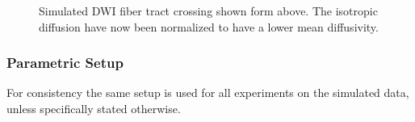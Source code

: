 \documentclass[twocolumn]{svjour3}
\begin{document}
\begin{figure}[!t]
  \centering {}
  \hspace*{.5cm}
  \caption{Simulated DWI fiber tract crossing shown form above. The isotropic diffusion
    have now been normalized to have a lower mean diffusivity.}
  \label{fig:crossingandnoise3}
\end{figure}
\subsubsection{Parametric Setup}
For consistency the same setup is used for all experiments on the simulated data, unless
specifically stated otherwise.
\end{document}
